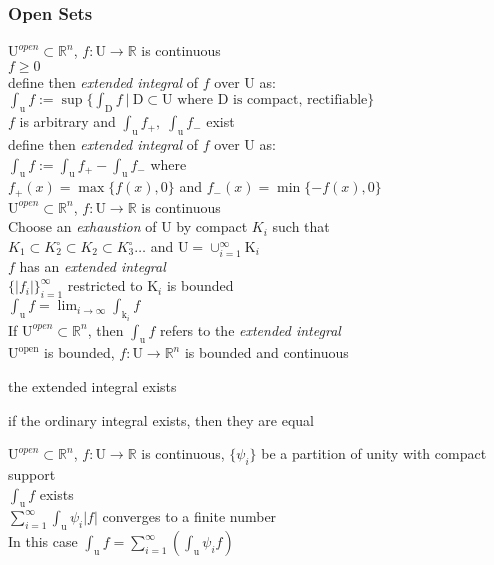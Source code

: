 \subsubsection{Open Sets}
\LET $\mathrm{U}^{open}\subset\mathbb{R}^n$,
$f:\mathrm{U}\to\mathbb{R}$ is continuous\\
\IF $f\geq 0$\\
\THEN define then \textit{extended integral} of $f$ over U as:\\
$\int_{\mathrm{u}}f := \sup\{\int_{\mathrm{D}}f\:|\:
\mathrm{D}\subset\mathrm{U}\text{ where } \mathrm{D}\text{ is compact, rectifiable} \}$\\
\IF $f$ is arbitrary and
 $\int_{\mathrm{u}}f_+,\;\int_{\mathrm{u}}f_-$ exist\\
\THEN define then \textit{extended integral} of $f$ over U as:\\
$\int_{\mathrm{u}}f:=\int_{\mathrm{u}}f_+-\int_{\mathrm{u}}f_-$ where\\
$f_+(x)=\max\{f(x),0\}$ and $f_-(x)=\min\{-f(x), 0\}$\\

\LET $\mathrm{U}^{open}\subset\mathbb{R}^n$,
$f:\mathrm{U}\to\mathbb{R}$ is continuous\\
Choose an \textit{exhaustion} of U by compact $K_i$ such that\\
$K_1\subset K_2^{\circ}\subset K_2\subset K_3^{\circ}\ldots$ and 
$\mathrm{U}=\cup_{i=1}^{\infty}\mathrm{K}_i$\\
$f$ has an \textit{extended integral}\\
\IFF $\{|f_i|\}_{i=1}^{\infty}$ restricted to $\mathrm{K}_i$ is bounded\\
\THEN $\int_{\mathrm{u}}f=\lim_{i\to\infty}\int_{\mathrm{k}_i}f$\\

\RMK
If $\mathrm{U}^{open}\subset\mathbb{R}^n$, then $\int_{\mathrm{u}}f$ refers to the
\textit{extended integral}\\

\LET
 $\mathrm{U^{open}}$ is bounded,
$f:\mathrm{U}\to\mathbb{R}^n $ is bounded and continuous\\
\THEN
\begin{myenumerate}
\item the extended integral exists
\item if the ordinary integral exists, then they are equal
\end{myenumerate}

\LET
$\mathrm{U}^{open}\subset\mathbb{R}^n$,
$f:\mathrm{U}\to\mathbb{R}$ is continuous,
$\{\psi_i\}$ be a partition of unity with compact support\\
\THEN $\int_{\mathrm{u}}f$ exists\\
\IFF $\sum_{i=1}^{\infty}\int_{\mathrm{u}}\psi_i|f|$ converges to a finite number\\
In this case $\int_{\mathrm{u}}f =\sum\limits_{i=1}^
\infty(\int_{\mathrm{u}}\psi_i f)$\\


